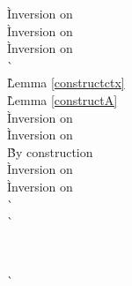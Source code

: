\begin{description}
\begin{tabbing}
  \` Inversion on  \\
 \` Inversion on  \\
  \` Inversion on  \\
 \`  \\
 \` Lemma \ref{constructctx} \\
 \` Lemma \ref{constructA} \\
  \` Inversion on  \\
  \` Inversion on  \\
 \` By construction \\
  \` Inversion on  \\
  \` Inversion on  \\
 \`  \\
 \`  \\
\end{tabbing}

\item[\rulestepcallnull] \ \\
  \begin{tabbing}
    \`  \\
  \end{tabbing}


\end{description}
